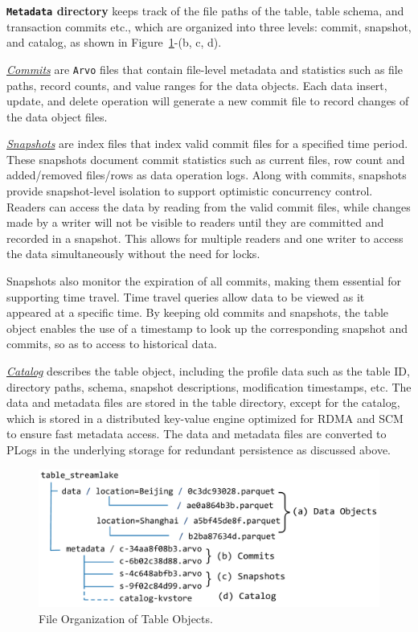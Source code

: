 \noindent \textbf{\texttt{Metadata} directory}  keeps track of the file paths of the table, table schema,  and transaction commits etc., which are organized into three levels: commit, snapshot, and catalog, as shown in Figure~\ref{fig:tableobject}-(b, c, d).

 \noindent \underline{\textit{Commits}} are \texttt{Arvo} files that contain file-level metadata and statistics such as file paths, record counts, and value ranges for the data objects. Each data insert, update, and delete operation will generate a new commit file to record changes of the data object files.


\noindent \underline{\textit{Snapshots}} are index files that index  valid commit files for a specified time period. These snapshots document commit statistics such as current files, row count and added/removed files/rows as data operation logs. Along with commits, snapshots provide snapshot-level isolation to support optimistic concurrency control. Readers can access the data by reading from the valid commit files, while changes made by a writer will not be visible to readers until they are committed and recorded in a snapshot. This allows for multiple readers and one writer to access the data simultaneously without the need for locks. 

Snapshots also monitor the expiration of all commits, making them essential for supporting time travel. Time travel queries allow data to be viewed as it appeared at a specific time. By keeping old commits and snapshots, the table object enables the use of a timestamp to look up the corresponding snapshot and commits, so as to access to historical data.

\noindent \underline{\textit{Catalog}}  describes the table object, including the profile data  such as the table ID, directory paths, schema, snapshot descriptions, modification timestamps, etc. The data and metadata files are stored in the table directory, except for the catalog, which is stored in a distributed key-value engine optimized for RDMA and SCM to ensure fast metadata access. The data and metadata files are converted to PLogs in the underlying storage for redundant persistence as discussed above.



\begin{figure}[htbp]
	
	\includegraphics[scale=0.3]{figures/tableobjects}
	\centering
	\vspace{-1em}
	\caption{File Organization of \sys Table Objects.}
	\label{fig:tableobject}
	\vspace{-1em}
\end{figure}


















